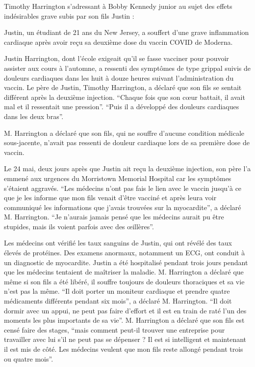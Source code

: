 Timothy Harrington s'adressant à Bobby Kennedy junior au sujet des effets
indésirables grave subis par son fils Justin :

Justin, un étudiant de 21 ans du New Jersey, a souffert d'une grave inflammation
cardiaque après avoir reçu sa deuxième dose du vaccin COVID de Moderna.

Justin Harrington, dont l'école exigeait qu'il se fasse vacciner pour pouvoir
assister aux cours à l'automne, a ressenti des symptômes de type grippal suivis
de douleurs cardiaques dans les huit à douze heures suivant l'administration du
vaccin. Le père de Justin, Timothy Harrington, a déclaré que son fils se sentait
différent après la deuxième injection. “Chaque fois que son cœur battait, il
avait mal et il ressentait une pression”. “Puis il a développé des douleurs
cardiaques dans les deux bras”.

M. Harrington a déclaré que son fils, qui ne souffre d'aucune condition médicale
sous-jacente, n'avait pas ressenti de douleur cardiaque lors de sa première dose
de vaccin.

Le 24 mai, deux jours après que Justin ait reçu la deuxième injection, son père
l'a emmené aux urgences du Morristown Memorial Hospital car les symptômes
s'étaient aggravés. “Les médecins n'ont pas fais le lien avec le vaccin jusqu'à
ce que je les informe que mon fils venait d'être vacciné et après leura voir
communiqué les informations que j'avais trouvées sur la myocardite”, a déclaré
M. Harrington. “Je n'aurais jamais pensé que les médecins aurait pu être
stupides, mais ils voient parfois avec des œillères”.

Les médecins ont vérifié les taux sanguins de Justin, qui ont révélé des taux
élevés de protéines. Des examens anormaux, notamment un ECG, ont conduit à un
diagnostic de myocardite. Justin a été hospitalisé pendant trois jours pendant
que les médecins tentaient de maîtriser la maladie. M. Harrington a déclaré que
même si son fils a été libéré, il souffre toujours de douleurs thoraciques et sa
vie n'est pas la même. “Il doit porter un moniteur cardiaque et prendre quatre
médicaments différents pendant six mois”, a déclaré M. Harrington. “Il doit
dormir avec un appui, ne peut pas faire d'effort et il est en train de raté l'un
des moments les plus importants de sa vie”. M. Harrington a déclaré que son fils
est censé faire des stages, “mais comment peut-il trouver une entreprise pour
travailler avec lui s'il ne peut pas se dépenser ? Il est si intelligent et
maintenant il est mis de côté. Les médecins veulent que mon fils reste allongé
pendant trois ou quatre mois”.

